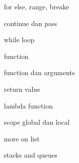 \vspace{14pt}
\noindent 
{\fontsize{14pt}{14pt}\selectfont for else, range, breake \\} \par
\vspace{14pt}
\noindent 
{\fontsize{14pt}{14pt}\selectfont continue dan pass \\} \par
\vspace{14pt}
\noindent 
{\fontsize{14pt}{14pt}\selectfont while loop \\} \par
\vspace{14pt}
\noindent 
{\fontsize{14pt}{14pt}\selectfont function \\} \par
\vspace{14pt}
\noindent 
{\fontsize{14pt}{14pt}\selectfont function dan arguments \\} \par
\vspace{14pt}
\noindent 
{\fontsize{14pt}{14pt}\selectfont return value \\} \par
\vspace{14pt}
\noindent 
{\fontsize{14pt}{14pt}\selectfont lambda function \\} \par
\vspace{14pt}
\noindent 
{\fontsize{14pt}{14pt}\selectfont scope global dan local \\} \par
\vspace{14pt}
\noindent 
{\fontsize{14pt}{14pt}\selectfont more on list \\} \par
\vspace{14pt}
\noindent 
{\fontsize{14pt}{14pt}\selectfont stacks and queues \\} \par
\vspace{14pt}
\vspace{14pt}
\vspace{14pt}
